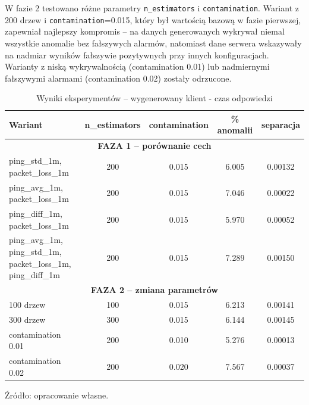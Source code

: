 W fazie 2 testowano różne parametry \texttt{n\_estimators} i \texttt{contamination}. Wariant z 200 drzew i \texttt{contamination}=0.015, który był wartością bazową w fazie pierwszej, zapewniał najlepszy kompromis – na danych generowanych wykrywał niemal wszystkie anomalie bez fałszywych alarmów, natomiast dane serwera wskazywały na nadmiar wyników fałszywie pozytywnych przy innych konfiguracjach. Warianty z niską wykrywalnością (contamination 0.01) lub nadmiernymi fałszywymi alarmami (contamination 0.02) zostały odrzucone.

\begin{table}[H]
	\centering
	\caption{Wyniki eksperymentów – wygenerowany klient - czas odpowiedzi}
	\label{tab:results-generated-ping}
	\vspace{10pt}
	
	\begin{tabular}{lcccc}
		\toprule
		Wariant & n\_estimators & contamination & \% anomalii & separacja \\
		\midrule
		
		\multicolumn{5}{c}{\textbf{FAZA 1 – porównanie cech}} \\
		\midrule
		ping\_std\_1m, packet\_loss\_1m & 200 & 0.015 & 6.005 & 0.00132 \\
		ping\_avg\_1m, packet\_loss\_1m & 200 & 0.015 & 7.046 & 0.00022 \\
		ping\_diff\_1m, packet\_loss\_1m & 200 & 0.015 & 5.970 & 0.00052 \\
		\makecell[l]{ping\_avg\_1m, ping\_std\_1m,\\packet\_loss\_1m, ping\_diff\_1m} & 200 & 0.015 & 7.289 & 0.00150 \\
		
		\midrule
		\multicolumn{5}{c}{\textbf{FAZA 2 – zmiana parametrów}} \\
		\midrule
		100 drzew & 100 & 0.015 & 6.213 & 0.00141 \\
		300 drzew & 300 & 0.015 & 6.144 & 0.00145 \\
		contamination 0.01 & 200 & 0.010 & 5.276 & 0.00013 \\
		contamination 0.02 & 200 & 0.020 & 7.567 & 0.00037 \\
		
		\bottomrule
	\end{tabular}
	
	\vspace{10pt}
	\small Źródło: opracowanie własne.
\end{table}

